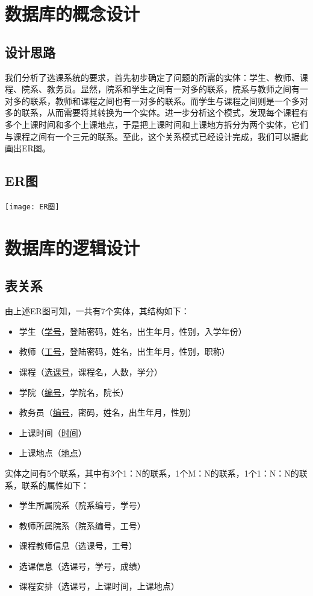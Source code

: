\documentclass[a4paper, 11pt, nofonts, nocap, fancyhdr]{ctexart}
\begin{document}
\newpage
\section{数据库的概念设计}

\subsection{设计思路}
我们分析了选课系统的要求，首先初步确定了问题的所需的实体：学生、教师、课程、院系、教务员。显然，院系和学生之间有一对多的联系，院系与教师之间有一对多的联系，教师和课程之间也有一对多的联系。而学生与课程之间则是一个多对多的联系，从而需要将其转换为一个实体。进一步分析这个模式，发现每个课程有多个上课时间和多个上课地点，于是把上课时间和上课地方拆分为两个实体，它们与课程之间有一个三元的联系。至此，这个关系模式已经设计完成，我们可以据此画出ER图。

\subsection{ER图}
	\texttt{[image: ER图]}

\section{数据库的逻辑设计}

\subsection{表关系}
由上述ER图可知，一共有7个实体，其结构如下：
\begin{itemize}
    \item 学生（\underline{学号}，登陆密码，姓名，出生年月，性别，入学年份）
    \item 教师（\underline{工号}，登陆密码，姓名，出生年月，性别，职称）
    \item 课程（\underline{选课号}，课程名，人数，学分）
    \item 学院（\underline{编号}，学院名，院长）
    \item 教务员（\underline{编号}，密码，姓名，出生年月，性别）
    \item 上课时间（\underline{时间}）
    \item 上课地点（\underline{地点}）
\end{itemize}

实体之间有5个联系，其中有3个1：N的联系，1个M：N的联系，1个1：N：N的联系，联系的属性如下：
\begin{itemize}
    \item 学生所属院系（院系编号，学号）
    \item 教师所属院系（院系编号，工号）
    \item 课程教师信息（选课号，工号）
    \item 选课信息（选课号，学号，成绩）
    \item 课程安排（选课号，上课时间，上课地点）
\end{itemize}
\end{document}
